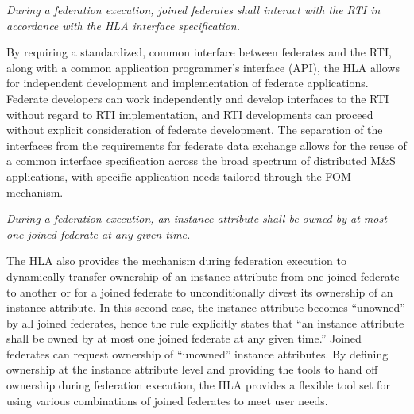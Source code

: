 \endgroup
\newpage
\begingroup
\addtolength{\topskip}{-0.7pt}

\textit{During a federation execution, joined federates shall interact with the RTI in accordance with the HLA\linebreak
interface specification.}

\vspace{6.1pt}
By requiring a standardized, common interface between federates and the RTI, along with a common\linebreak
application programmer's interface (API), the HLA allows for independent development and\linebreak
implementation of federate applications. Federate developers can work independently and develop\linebreak
interfaces to the RTI without regard to RTI implementation, and RTI developments can proceed without\linebreak
explicit consideration of federate development. The separation of the interfaces from the requirements for\linebreak
federate data exchange allows for the reuse of a common interface specification across the broad spectrum\linebreak
of distributed M\&S applications, with specific application needs tailored through the FOM mechanism.

\vspace{4.5pt}

\textit{During a federation execution, an instance attribute shall be owned by at most one joined federate at any\linebreak
given time.}

\vspace{6.1pt}
The HLA also provides the mechanism during federation execution to dynamically transfer ownership of an\linebreak
instance attribute from one joined federate to another or for a joined federate to unconditionally divest its\linebreak
ownership of an instance attribute. In this second case, the instance attribute becomes ``unowned'' by all\linebreak
joined federates, hence the rule explicitly states that ``an instance attribute shall be owned by at most one\linebreak
joined federate at any given time.'' Joined federates can request ownership of ``unowned'' instance attributes.\linebreak
By defining ownership at the instance attribute level and providing the tools to hand off ownership during\linebreak
federation execution, the HLA provides a flexible tool set for using various combinations of joined federates\linebreak
to meet user needs.

